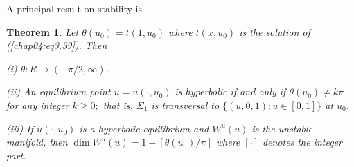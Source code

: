 \documentclass{surv-l}
\theoremstyle{plain}
\newtheorem{theorem}{Theorem}[section]
\theoremstyle{definition}
\numberwithin{equation}{section}
\numberwithin{figure}{chapter}
\begin{document}
A principal result on stability is

\begin{theorem}\label{thm4.3.13} Let $\theta(u_{0})=t(1, u_{0})$ where $t(x, u_{0})$ is the solution of \emph{(\ref{chap04:eq3.39})}. Then

\emph{(i)} $\theta\!:R\rightarrow(-\pi/2, \infty)$.

\emph{(ii)} An equilibrium point $u=u(\cdot, u_{0})$ is hyperbolic if and only if $\theta(u_{0})\neq k\pi$ for any integer $k\geq 0;$ that is, $\Sigma_{1}$ is transversal to $\{(u, 0,1)\!:u \in[0,1]\}$ at $u_{0}$.

\emph{(iii)} If $u(\cdot, u_{0})$ is a hyperbolic equilibrium and $W^{u}(u)$ is the unstable manifold, then $\dim W^{u}(u)=1+[\theta(u_{0})/\pi]$ where $[\cdot]$ denotes the integer part.
\end{theorem}
\end{document}
